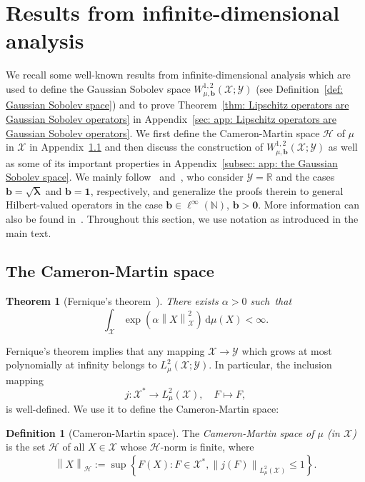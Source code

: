 \documentclass[namedate,webpdf]{ima-authoring-template-blank}
\def\D{\,\mathrm{d}}
\newcommand*{\nm}[1]{{\left\|#1\right \|}}
\newcounter{counter}
\numberwithin{counter}{section}
\numberwithin{equation}{section}
\theoremstyle{plain}
\newtheorem{theorem}[counter]{Theorem}
\theoremstyle{definition}
\newtheorem{definition}[counter]{Definition}
\newcommand*{\cH}{\mathcal{H}}
\newcommand*{\cX}{\mathcal{X}}
\newcommand*{\cY}{\mathcal{Y}}
\newcommand*{\bbN}{\mathbb{N}}
\newcommand*{\bbR}{\mathbb{R}}
\theoremstyle{thmstyletwo}
\begin{document}
\section{Results from infinite-dimensional analysis}
\label{sec: app: results from infinite-dimensional analysis}

We recall some well-known results from infinite-dimensional analysis which are used to define the Gaussian Sobolev space \(W_{\mu, \bm{b}}^{1,2}(\cX; \cY)\) (see Definition~\ref{def: Gaussian Sobolev space}) and to prove Theorem~\ref{thm: Lipschitz operators are Gaussian Sobolev operators} in Appendix~\ref{sec: app: Lipschitz operators are Gaussian Sobolev operators}. 
We first define the Cameron-Martin space \(\cH\) of \(\mu\) in \( \cX \) in Appendix~\ref{subsec: app: the Cameron-Martin space} and then discuss the construction of \(W_{\mu, \bm{b}}^{1,2}(\cX; \cY)\) as well as some of its important properties in Appendix~\ref{subsec: app: the Gaussian Sobolev space}.
We mainly follow~\citet{lunardi_InfiniteDimensionalAnalysis_2015} and~\citet{daprato_IntroductionInfiniteDimensionalAnalysis_2006}, who consider \(\cY = \bbR\) and the cases \(\bm{b} = \sqrt{\bm{\lambda}}\) and \(\bm{b} = \bm{1}\), respectively, and generalize the proofs therein to general Hilbert-valued operators in the case \(\bm{b} \in \ell^{\infty}(\bbN)\), \(\bm{b} > \bm{0}\). More information can also be found in~\citet{bogachev_GaussianMeasures_1998}. Throughout this section, we use notation as introduced in the main text.



\subsection{The Cameron-Martin space}
\label{subsec: app: the Cameron-Martin space}

\begin{theorem}[{Fernique's theorem~\citep[Thm. 2.8.5]{bogachev_GaussianMeasures_1998}}]
\label{thm: Fernique theorem}
    There exists \(\alpha > 0\) such~that
    \[
    \int_{\cX} \exp(\alpha \nm{X}_{\cX}^2) \D \mu(X) < \infty.
    \]
\end{theorem}
Fernique's theorem implies that any mapping \(\cX \to \cY\) which grows at most polynomially at infinity belongs to \(L_{\mu}^2(\cX; \cY)\). In particular, the inclusion mapping
\[
j: \cX^* \to L_{\mu}^2(\cX), \quad F \mapsto F,
\]
is well-defined. We use it to define the Cameron-Martin space:

\begin{definition}[Cameron-Martin space]
    The \emph{Cameron-Martin space of \(\mu\) (in \(\cX\))} is the set \(\cH\) of all \(X \in \cX\) whose \(\cH\)-norm is finite, where
    \[
    \nm{X}_{\cH} := \sup\left\{F(X): F\in \cX^*, \nm{j(F)}_{L_{\mu}^2(\cX)} \leq 1 \right\}.
    \]
\end{definition}
\end{document}
